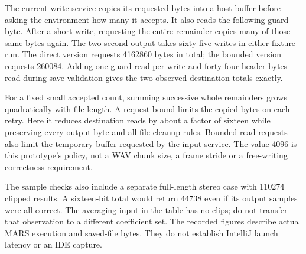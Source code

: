 The current write service copies its requested bytes into a host buffer before asking
the environment how many it accepts. It also reads the following guard byte. After a
short write, requesting the entire remainder copies many of those same bytes again.
The two-second output takes sixty-five writes in either fixture run. The direct
version requests 4162860 bytes in total; the bounded version requests 260084. Adding
one guard read per write and forty-four header bytes read during save validation gives
the two observed destination totals exactly.

For a fixed small accepted count, summing successive whole remainders grows
quadratically with file length. A request bound limits the copied bytes on each retry.
Here it reduces destination reads by about a factor of sixteen while preserving every
output byte and all file-cleanup rules. Bounded read requests also limit the temporary
buffer requested by the input service. The value 4096 is this prototype's policy, not
a WAV chunk size, a frame stride or a free-writing correctness requirement.

The sample checks also include a separate full-length stereo case with 110274 clipped
results. A sixteen-bit total would return 44738 even if its output samples were all
correct. The averaging input in the table has no clips; do not transfer that observation
to a different coefficient set. The recorded figures describe actual MARS execution
and saved-file bytes. They do not establish IntelliJ launch latency or an IDE capture.
